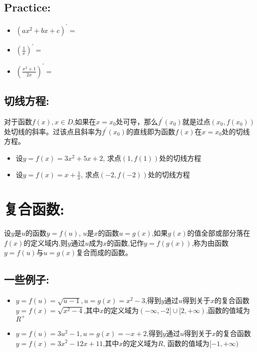 \documentclass[UTF8]{article}
\begin{document}
\subsection{Practice:}

\begin{itemize}
	\item $(ax^2 + bx + c)^{'} = $
	\item $(\frac{1}{x})^{'} = $
	\item $(\frac{x^2 + 1}{2x})^{'} = $
\end{itemize}


\subsection{切线方程:}

对于函数$f(x), x\in D$,如果在$x = x_0$处可导，那么$f^{'}(x_0)$就是过点$(x_0, f(x_0))$处切线的斜率。过该点且斜率为$f^{'}(x_0)$的直线即为函数$f(x)$在$x = x_0$处的切线方程。

\begin{itemize}
	\item 设$y = f(x) = 3x^2 + 5x + 2$, 求点$(1, f(1))$处的切线方程
	\item 设$y = f(x) = x + \frac{1}{x}$, 求点$(-2, f(-2))$处的切线方程
\end{itemize}
\section{复合函数:}

设$y$是$u$的函数$y = f(u)$, $u$是$x$的函数$u = g(x)$,如果$g(x)$的值全部或部分落在$f(x)$的定义域内,则$y$通过$u$成为$x$的函数,记作$y = f(g(x))$,称为由函数$y = f(u)$与$u = g(x)$复合而成的函数。

\subsection{一些例子:}

\begin{itemize}
	\item $y = f(u) = \sqrt{u - 1}, u = g(x) = x^2 - 3$,得到$y$通过$u$得到关于$x$的复合函数$y = f(x) = \sqrt{x^2 - 4}$,其中$x$的定义域为$(-\infty, -2] \cup [2, +\infty)$,函数的值域为$R^{+}$

	\item $y = f(u) = 3u^2 - 1, u = g(x) = -x + 2$,得到$y$通过$u$得到关于$x$的复合函数$y = f(x) = 3x^2 - 12x + 11$,其中$x$的定义域为$R$, 函数的值域为$[-1, +\infty)$
\end{itemize}
\end{document}
